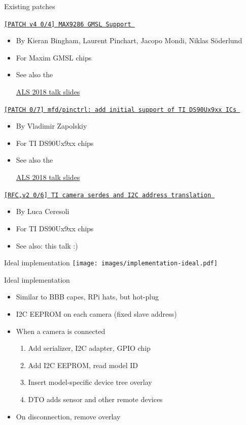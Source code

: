 \documentclass[xetex,table,aspectratio=169]{beamer}
\newcommand{\myhref}[2]{
  \href{#1}{#2 {\tiny\faExternalLink{}}}
}
\begin{document}
\begin{frame}{Existing patches}
  \myhref{https://lore.kernel.org/linux-media/20181102154723.23662-1-kieran.bingham@ideasonboard.com/}
         {\tt [PATCH v4 0/4] MAX9286 GMSL Support}
  \begin{itemize}
  \item By Kieran Bingham, Laurent Pinchart, Jacopo Mondi, Niklas Söderlund
  \item For Maxim GMSL chips
  \item See also the
    \myhref{https://www.slideshare.net/KieranBingham/gmsl-in-linux}
           {ALS 2018 talk slides}
  \end{itemize}

  \pause
  \myhref{https://lore.kernel.org/linux-media/20181008211205.2900-1-vz@mleia.com/}
         {\tt [PATCH 0/7] mfd/pinctrl: add initial support of TI DS90Ux9xx ICs}
  \begin{itemize}
  \item By Vladimir Zapolskiy
  \item For TI DS90Ux9xx chips
  \item See also the
    \myhref{https://schd.ws/hosted_files/ossalsjp18/8a/vzapolskiy_als2018.pdf}
           {ALS 2018 talk slides}
  \end{itemize}

  \pause
  \myhref{https://lore.kernel.org/linux-media/20190723203723.11730-1-luca@lucaceresoli.net/}
         {\tt [RFC,v2 0/6] TI camera serdes and I2C address translation}
  \begin{itemize}
  \item By Luca Ceresoli
  \item For TI DS90Ux9xx chips
  \item See also: this talk :)
  \end{itemize}
\end{frame}

\begin{frame}{Ideal implementation}
  \center\texttt{[image: images/implementation-ideal.pdf]}
\end{frame}

\begin{frame}{Ideal implementation}
  \begin{itemize}
  \item Similar to BBB capes, RPi hats, but hot-plug
  \item I2C EEPROM on each camera (fixed slave address)
  \item When a camera is connected
    \begin{enumerate}
    \item Add serializer, I2C adapter, GPIO chip
    \item Add I2C EEPROM, read model ID
    \item Insert model-specific device tree overlay
    \item DTO adds sensor and other remote devices
    \end{enumerate}
  \item On disconnection, remove overlay
  \end{itemize}
\end{frame}
\end{document}
